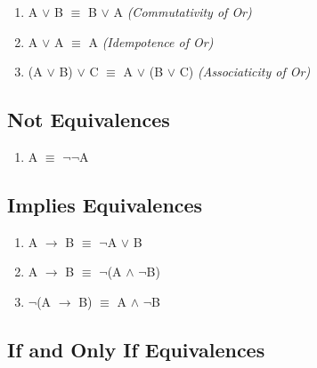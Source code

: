 \documentclass{report}
\begin{document}
\begin{enumerate}



  \item A $\lor$ B $\equiv$ B $\lor$ A \emph{(Commutativity of Or)}

	\item A $\lor$ A $\equiv$ A \emph{(Idempotence of Or)}

  \item (A $\lor$ B) $\lor$ C $\equiv$ A $\lor$ (B $\lor$ C) \emph{(Associaticity of Or)}



\end{enumerate}



\subsection{Not Equivalences}

\begin{enumerate}



  \item A $\equiv$ $\neg$$\neg$A



\end{enumerate}



\subsection{Implies Equivalences}

\begin{enumerate}



  \item A $\to$ B $\equiv$ $\neg$A $\lor$ B

  \item A $\to$ B $\equiv$ $\neg$(A $\land$ $\neg$B)

  \item $\neg$(A $\to$ B) $\equiv$ A $\land$ $\neg$B



\end{enumerate}



\subsection{If and Only If Equivalences}
\end{document}
